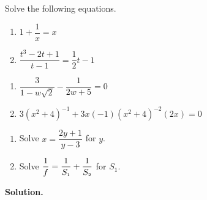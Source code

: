 \pagebreak

\begin{ex}\label{rateqnreviewex} Solve the following equations.

\begin{multicols}{2}
\begin{enumerate}

\item  $1 + \dfrac{1}{x} = x$

\item  $\dfrac{t^3-2t+1}{t-1} = \dfrac{1}{2}t-1$



\setcounter{HW}{\value{enumi}}
\end{enumerate}

\end{multicols}

\begin{multicols}{2}
\begin{enumerate}
\setcounter{enumi}{\value{HW}}


\item  $\dfrac{3}{1 - w\sqrt{2}} - \dfrac{1}{2w+5} = 0$

\item $3(x^2+4)^{-1} + 3x(-1)(x^2+4)^{-2}(2x) = 0$

\setcounter{HW}{\value{enumi}}
\end{enumerate}

\end{multicols}

\begin{multicols}{2}
\begin{enumerate}
\setcounter{enumi}{\value{HW}}

\item  Solve $x = \dfrac{2y+1}{y-3}$ for $y$. 

\item  Solve $\dfrac{1}{f} = \dfrac{1}{S_{\text{\tiny $1$}}} + \dfrac{1}{S_{\text{\tiny $2$}}}$ for $S_{1}$.

\setcounter{HW}{\value{enumi}}
\end{enumerate}

\end{multicols}

{\bf Solution.} 

\begin{enumerate}


\end{enumerate}
\end{ex}
